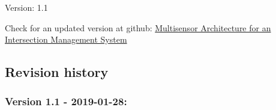 \begin{titlepage}
    \begin{center}
%   
%        
%		        
%        
%        
%        
%		
%        
Version: 1.1 \\
\vspace{2cm}

      
\end{center}
    
Check for an updated version at github: 
\href{https://github.com/gustavovelascoh/msc-report/wiki}{Multisensor Architecture for an Intersection Management System}


\subsection*{Revision history}
\footnotesize
\subsubsection*{Version 1.1 - 2019-01-28:}


\end{titlepage}
